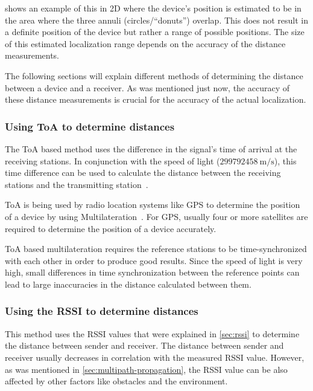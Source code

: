  shows an example of this in 2D where the device's position is estimated to be in the area where the three annuli (circles/``donuts'') overlap.
This does not result in a definite position of the device but rather a range of possible positions.
The size of this estimated localization range depends on the accuracy of the distance measurements.

The following sections will explain different methods of determining the distance between a device and a receiver.
As was mentioned just now, the accuracy of these distance measurements is crucial for the accuracy of the actual localization.

\subsubsection{Using \acl{ToA} to determine distances}\label{sec:toa-based-multilateration}

The \acf{ToA} based method uses the difference in the signal's time of arrival at the receiving stations.
In conjunction with the speed of light ($299792458\ \mathrm{m/s}$), this time difference can be used to calculate the distance between the receiving stations and the transmitting station~\cite{khalaf-allah_time_2015}.

\ac{ToA} is being used by radio location systems like \ac{GPS} to determine the position of a device by using Multilateration~\cite{department_of_defense_usa_gps_2020}.
For GPS, usually four or more satellites are required to determine the position of a device accurately.

\ac{ToA} based multilateration requires the reference stations to be time-synchronized with each other in order to produce good results.
Since the speed of light is very high, small differences in time synchronization between the reference points can lead to large inaccuracies in the distance calculated between them.

\subsubsection{Using the \acl{RSSI} to determine distances}\label{sec:rssi-based-multilateration}

This method uses the \acf{RSSI} values that were explained in \cref{sec:rssi} to determine the distance between sender and receiver.
The distance between sender and receiver usually decreases in correlation with the measured \ac{RSSI} value.
However, as was mentioned in \cref{sec:multipath-propagation}, the \ac{RSSI} value can be also affected by other factors like obstacles and the environment.

